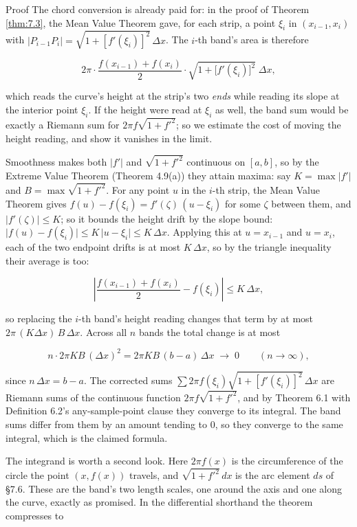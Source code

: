\documentclass[a4paper,12pt,oneside]{memoir}
\begin{document}
\begin{envproof}{Proof}{}{}
The chord conversion is already paid for: in the proof of Theorem \ref{thm:7.3}, the Mean Value Theorem gave, for each strip, a point \(\xi_i\) in \((x_{i-1}, x_i)\) with \(\lvert P_{i-1}P_i\rvert = \sqrt{1 + [f'(\xi_i)]^{2}}\,\Delta x\). The \(i\)-th band’s area is therefore

\[ 2\pi\cdot\frac{f(x_{i-1}) + f(x_i)}{2}\cdot\sqrt{1 + \bigl[f'(\xi_i)\bigr]^{2}}\;\Delta x, \]

which reads the curve’s height at the strip’s two \emph{ends} while reading its slope at the interior point \(\xi_i\). If the height were read at \(\xi_i\) as well, the band sum would be exactly a Riemann sum for \(2\pi f\sqrt{1 + f'^{2}}\); so we estimate the cost of moving the height reading, and show it vanishes in the limit.

Smoothness makes both \(\lvert f'\rvert\) and \(\sqrt{1 + f'^{2}}\) continuous on \([a, b]\), so by the Extreme Value Theorem (Theorem 4.9(a)) they attain maxima: say \(K = \max \lvert f'\rvert\) and \(B = \max \sqrt{1 + f'^{2}}\). For any point \(u\) in the \(i\)-th strip, the Mean Value Theorem gives \(f(u) - f(\xi_i) = f'(\zeta)\,(u - \xi_i)\) for some \(\zeta\) between them, and \(\lvert f'(\zeta)\rvert \le K\); so it bounds the height drift by the slope bound: \(\lvert f(u) - f(\xi_i)\rvert \le K\,\lvert u - \xi_i\rvert \le K\,\Delta x\). Applying this at \(u = x_{i-1}\) and \(u = x_i\), each of the two endpoint drifts is at most \(K\,\Delta x\), so by the triangle inequality their average is too:

\[ \left\lvert \frac{f(x_{i-1}) + f(x_i)}{2} - f(\xi_i) \right\rvert \le K\,\Delta x, \]

so replacing the \(i\)-th band’s height reading changes that term by at most \(2\pi\,(K \Delta x)\,B\,\Delta x\). Across all \(n\) bands the total change is at most

\[ n \cdot 2\pi K B\,(\Delta x)^{2} = 2\pi K B\,(b - a)\,\Delta x \;\longrightarrow\; 0 \qquad (n \to \infty), \]

since \(n\,\Delta x = b - a\). The corrected sums \(\sum 2\pi f(\xi_i)\sqrt{1 + [f'(\xi_i)]^{2}}\,\Delta x\) are Riemann sums of the continuous function \(2\pi f \sqrt{1 + f'^{2}}\), and by Theorem 6.1 with Definition 6.2’s any-sample-point clause they converge to its integral. The band sums differ from them by an amount tending to \(0\), so they converge to the same integral, which is the claimed formula. \qedmark
\end{envproof}
The integrand is worth a second look. Here \(2\pi f(x)\) is the circumference of the circle the point \((x, f(x))\) travels, and \(\sqrt{1 + f'^{2}}\,dx\) is the arc element \(ds\) of §7.6. These are the band’s two length scales, one around the axis and one along the curve, exactly as promised. In the differential shorthand the theorem compresses to
\end{document}
